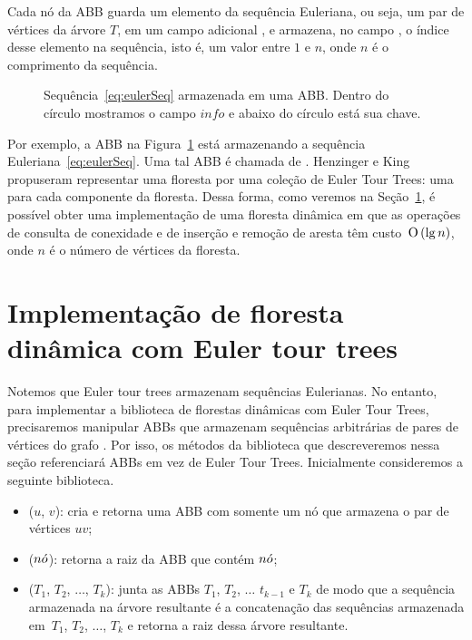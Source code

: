 Cada nó da ABB guarda um elemento da sequência Euleriana, ou seja, um par de vértices da árvore $T$, em um campo adicional , e armazena, no campo , o índice desse elemento na sequência, isto é, um valor entre $1$ e $n$, onde $n$ é o comprimento da sequência.

\begin{figure}[htb]
\centering
\caption{Sequência~\eqref{eq:eulerSeq}  armazenada em uma ABB. Dentro do círculo mostramos o campo $info$ e abaixo do círculo está sua chave.}
\label{fig:seq-treap-indices}
\end{figure}

Por exemplo, a ABB na Figura~\ref{fig:seq-treap-indices} está armazenando a sequência Euleriana~\eqref{eq:eulerSeq}. Uma tal ABB é chamada de . Henzinger e King propuseram representar uma floresta por uma coleção de Euler Tour Trees: uma para cada componente da floresta. Dessa forma, como veremos na Seção~\ref{sec:impleDF-ETT}, é possível obter uma implementação de uma floresta dinâmica em que as operações de consulta de conexidade e de inserção e remoção de aresta têm custo~$\text{O}\left(\lg n\right)$, onde $n$ é o número de vértices da floresta.


\section{Implementação de floresta dinâmica com Euler tour trees}
\label{sec:impleDF-ETT}

Notemos que Euler tour trees armazenam sequências Eulerianas. No entanto, para implementar a biblioteca de florestas dinâmicas com Euler Tour Trees, precisaremos manipular ABBs que armazenam sequências arbitrárias de pares de vértices do grafo . Por isso, os métodos da biblioteca que descreveremos nessa seção referenciará ABBs em vez de Euler Tour Trees. Inicialmente consideremos a seguinte biblioteca.

\begin{itemize}
\item  \treapCreate($u$, $v$): cria e retorna uma ABB com somente um nó que armazena o par de vértices $uv$;
\item \treapGetRoot($n\acute{o}$): retorna a raiz da ABB que contém $n\acute{o}$;
\item \treapJoin($T_1$, $T_2$, $\ldots$, $T_k$): junta as ABBs $T_1$, $T_2$, $\ldots$ $t_{k-1}$ e $T_k$ de modo que a sequência armazenada na árvore resultante é a concatenação das sequências armazenada em~$T_1$, $T_2$, $\ldots$, $T_k$ e retorna a raiz dessa árvore resultante.
\end{itemize}


